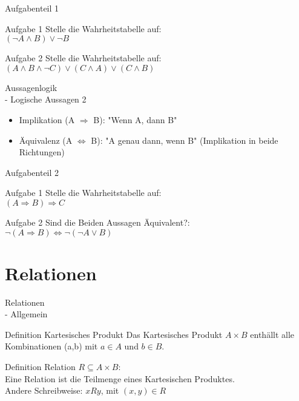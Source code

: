 \documentclass[18pt]{beamer}
\begin{document}
\begin{frame}{Aufgabenteil 1}
\begin{block}{Aufgabe 1}
Stelle die Wahrheitstabelle auf:\\
$(\neg A \land B) \lor \neg B$
\end{block}
\begin{block}{Aufgabe 2}
Stelle die Wahrheitstabelle auf:\\
$(A \land B \land \neg C) \lor (C \land A) \lor (C \land B)$
\end{block}
\end{frame}


\begin{frame}{Aussagenlogik\\ - Logische Aussagen 2}
\begin{itemize}
\item Implikation (A $\Rightarrow$ B): "Wenn A, dann B"
\pause
\item \"Aquivalenz (A $\Leftrightarrow$ B): "A genau dann, wenn B" (Implikation in beide Richtungen)
\end{itemize}
\end{frame}


\begin{frame}{Aufgabenteil 2}
\begin{block}{Aufgabe 1}
Stelle die Wahrheitstabelle auf:\\
$(A \Rightarrow B) \Rightarrow C$
\end{block}
\begin{block}{Aufgabe 2}
Sind die Beiden Aussagen \"Aquivalent?:\\
$\neg (A \Rightarrow B) \Leftrightarrow \neg (\neg A \lor B)$
\end{block}
\end{frame}


\section{Relationen}
\begin{frame}{Relationen \\ - Allgemein}

\begin{block} {Definition Kartesisches Produkt}
Das Kartesisches Produkt $A \times B$ enth\"allt alle Kombinationen (a,b) mit $a \in A$ und $b \in B$.
\end{block}

\begin{block} {Definition Relation}
$R \subseteq A \times B$:\\
Eine Relation ist die Teilmenge eines Kartesischen Produktes.\\
Andere Schreibweise: $xRy$, mit $(x, y) \in R$
\end{block}
\end{frame}
\end{document}
